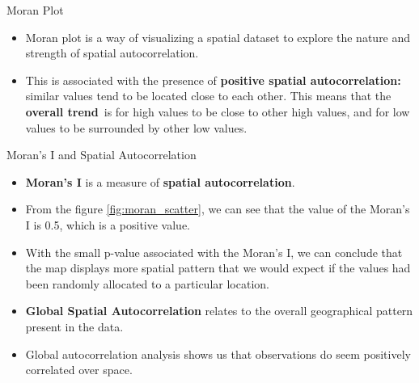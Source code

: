 \documentclass[10pt, aspectratio=169]{beamer}
\begin{document}
\begin{frame}{Moran Plot}
    \begin{itemize}
        \item Moran plot is a way of visualizing a spatial dataset to explore the nature and strength of spatial autocorrelation.
        \item This is associated with the presence of \textbf{positive spatial autocorrelation:} similar values tend to be located close to each other. This means that the \textbf{overall trend} is for high values to be close to other high values, and for low values to be surrounded by other low values.
    \end{itemize}

\end{frame}


\begin{frame}{Moran's I and Spatial Autocorrelation}
    \begin{itemize}

        \item \textbf{Moran's I} is a measure of \textbf{spatial autocorrelation}.
        \item From the figure \ref{fig:moran_scatter}, we can see that the value of the Moran's I is 0.5, which is a positive value.
        \item With the small p-value associated with the Moran's I, we can conclude that the map displays
        more spatial pattern that we would expect if the values had been randomly allocated to a particular location.
        \item \textbf{Global Spatial Autocorrelation} relates to the overall geographical pattern present in the data.
        \item Global autocorrelation analysis shows us that observations do seem positively correlated over space.


    \end{itemize}


\end{frame}
\end{document}
